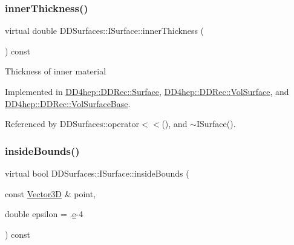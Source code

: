 \hypertarget{class_d_d_surfaces_1_1_i_surface_ab6913582dd6c1f44df2038705ce2aea6}{}\label{class_d_d_surfaces_1_1_i_surface_ab6913582dd6c1f44df2038705ce2aea6} 
\subsubsection{\texorpdfstring{inner\+Thickness()}{innerThickness()}}
{\footnotesize\ttfamily virtual double D\+D\+Surfaces\+::\+I\+Surface\+::inner\+Thickness (\begin{DoxyParamCaption}{ }\end{DoxyParamCaption}) const\hspace{0.3cm}{\ttfamily [pure virtual]}}

Thickness of inner material 

Implemented in \hyperlink{class_d_d4hep_1_1_d_d_rec_1_1_surface_a784001d72c1c77429fab90220c2af7e8}{D\+D4hep\+::\+D\+D\+Rec\+::\+Surface}, \hyperlink{class_d_d4hep_1_1_d_d_rec_1_1_vol_surface_a78818e330968041cb17c0694d380ff3f}{D\+D4hep\+::\+D\+D\+Rec\+::\+Vol\+Surface}, and \hyperlink{class_d_d4hep_1_1_d_d_rec_1_1_vol_surface_base_af4f950cb7ebf4cef9d35bb5e59d81e8a}{D\+D4hep\+::\+D\+D\+Rec\+::\+Vol\+Surface\+Base}.



Referenced by D\+D\+Surfaces\+::operator$<$$<$(), and $\sim$\+I\+Surface().

\hypertarget{class_d_d_surfaces_1_1_i_surface_a16aa78cb8c01cd5993b7cf23f55a7e3a}{}\label{class_d_d_surfaces_1_1_i_surface_a16aa78cb8c01cd5993b7cf23f55a7e3a} 
\subsubsection{\texorpdfstring{inside\+Bounds()}{insideBounds()}}
{\footnotesize\ttfamily virtual bool D\+D\+Surfaces\+::\+I\+Surface\+::inside\+Bounds (\begin{DoxyParamCaption}\item[{const \hyperlink{class_d_d_surfaces_1_1_vector3_d}{Vector3D} \&}]{point,  }\item[{double}]{epsilon = {.\hyperlink{_volumes_8cpp_a8a9a1f93e9b09afccaec215310e64142}{e}-\/4} }\end{DoxyParamCaption}) const\hspace{0.3cm}{\ttfamily [pure virtual]}}



